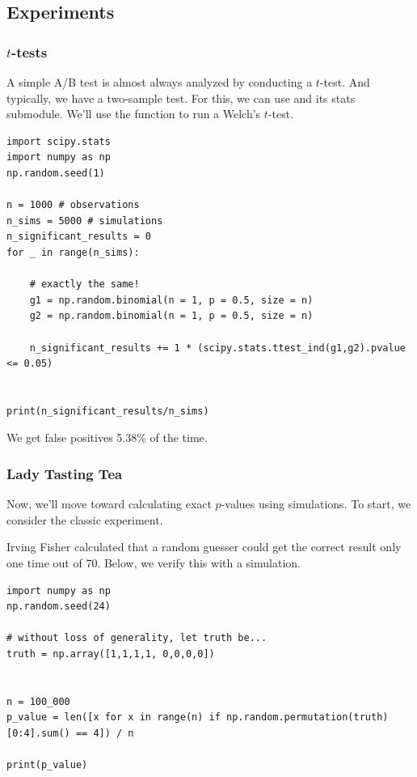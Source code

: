 \subsection{Experiments}


\subsubsection{$t$-tests}
A simple A/B test is almost always analyzed by conducting a $t$-test. And typically, we have a two-sample test. For this, we can use  and its stats submodule. 
We'll use the  function to run a Welch's $t$-test.


\begin{lstlisting}
import scipy.stats
import numpy as np
np.random.seed(1)

n = 1000 # observations
n_sims = 5000 # simulations
n_significant_results = 0
for _ in range(n_sims):
    
    # exactly the same!
    g1 = np.random.binomial(n = 1, p = 0.5, size = n)
    g2 = np.random.binomial(n = 1, p = 0.5, size = n)
    
    n_significant_results += 1 * (scipy.stats.ttest_ind(g1,g2).pvalue <= 0.05)
    
    
print(n_significant_results/n_sims)
\end{lstlisting}

We get false positives 5.38\% of the time. 


\subsubsection{Lady Tasting Tea}

Now, we'll move toward calculating exact $p$-values using simulations. To start, we consider the classic  experiment. 

Irving Fisher calculated that a random guesser could get the correct result only one time out of 70. Below, we verify this with a simulation.

\begin{lstlisting}
import numpy as np
np.random.seed(24)

# without loss of generality, let truth be...
truth = np.array([1,1,1,1, 0,0,0,0])


n = 100_000
p_value = len([x for x in range(n) if np.random.permutation(truth)[0:4].sum() == 4]) / n

print(p_value)
\end{lstlisting}


